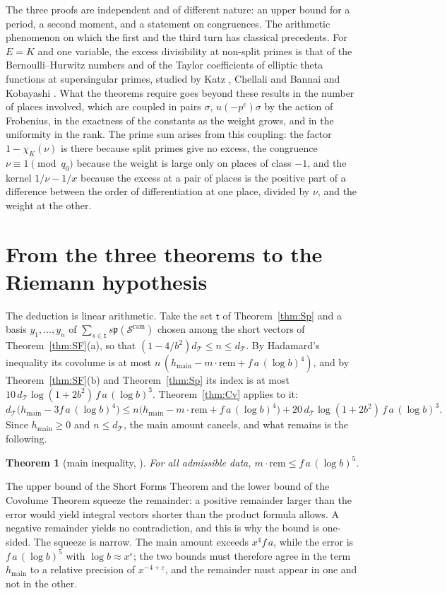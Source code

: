 \documentclass[10pt]{amsart}
\newtheorem{theorem}{Theorem}[section]
\theoremstyle{definition}
\theoremstyle{remark}
\newcommand{\cS}{\mathcal S^{\mathrm{ram}}}
\newcommand{\dT}{d_{\mathcal T}}
\newcommand{\hmain}{h_{\mathrm{main}}}
\newcommand{\rem}{\mathrm{rem}}
\newcommand{\pp}{\mathfrak p}
\begin{document}
The three proofs are independent and of different nature: an upper bound for a period, a
second moment, and a statement on congruences. The arithmetic phenomenon on which the first and
the third turn has classical precedents. For $E=K$ and one variable, the excess divisibility at
non-split primes is that of the Bernoulli--Hurwitz numbers and of the Taylor coefficients of
elliptic theta functions at supersingular primes, studied by Katz \cite{KatzDivisibilities},
Chellali \cite{Chellali} and Bannai and Kobayashi \cite{BannaiKobayashi}. What the theorems
require goes beyond these results in the number of places involved, which are coupled in pairs
$\sigma$, $u(-p^e)\sigma$ by the action of Frobenius, in the exactness of the constants as the
weight grows, and in the uniformity in the rank. The prime sum arises from this coupling: the
factor $1-\chi_K(\nu)$ is there because split primes give no excess, the congruence
$\nu\equiv1\pmod{q_0}$ because the weight is large only on places of class $-1$, and the kernel
$1/\nu-1/x$ because the excess at a pair of places is the positive part of a difference between
the order of differentiation at one place, divided by $\nu$, and the weight at the other.

\section{From the three theorems to the Riemann hypothesis}\label{sec:squeeze}
The deduction is linear arithmetic. Take the set $\mathsf t$ of Theorem~\ref{thm:Sp} and a basis
$y_1,\dots,y_n$ of $\sum_{s\in\mathsf t}s\pp(\cS)$ chosen among the short vectors of
Theorem~\ref{thm:SF}(a), so that $(1-4/b^2)\dT\le n\le\dT$. By Hadamard's inequality its
covolume is at most $n\,(\hmain-m\cdot\rem+f\,a\,(\log b)^4)$, and by Theorem~\ref{thm:SF}(b) and
Theorem~\ref{thm:Sp} its index is at most $10\,\dT\log(1+2b^2)\,f\,a\,(\log b)^3$.
Theorem~\ref{thm:Cv} applies to it:
\[
 \dT\bigl(\hmain-3f\,a\,(\log b)^4\bigr)\le n\bigl(\hmain-m\cdot\rem+f\,a\,(\log b)^4\bigr)+20\,\dT\log(1+2b^2)\,f\,a\,(\log b)^3 .
\]
Since $\hmain\ge0$ and $n\le\dT$, the main amount cancels, and what remains is the following.

\begin{theorem}[main inequality, {\cite{P46}}]\label{thm:main}
For all admissible data, $m\cdot\rem\le f\,a\,(\log b)^5$.
\end{theorem}
The upper bound of the Short Forms Theorem and the lower bound of the Covolume Theorem squeeze
the remainder: a positive remainder larger than the error would yield integral vectors
shorter than the product formula allows. A negative remainder yields no contradiction, and
this is why the bound is one-sided. The squeeze is narrow. The main amount exceeds
$x^4f\,a$, while the error is $f\,a\,(\log b)^5$ with $\log b\approx x^\varepsilon$; the two
bounds must therefore agree in the term $\hmain$ to a relative precision of $x^{-4+\varepsilon}$, and
the remainder must appear in one and not in the other.
\end{document}

